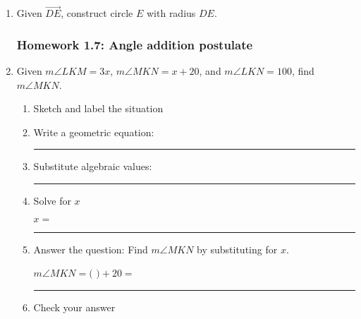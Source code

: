 \documentclass[12pt, twoside]{article}
\begin{document}
\begin{enumerate}
\item Given $\overrightarrow{DE}$, construct circle $E$ with radius $DE$.
    \vspace{3cm}
    \begin{center}
    \end{center}

\newpage
\subsubsection*{Homework 1.7: Angle addition postulate}
\item Given $m\angle LKM = 3x$, $m\angle MKN = x+20$, and $m\angle LKN = 100$, find $m\angle MKN$.  \vspace{1cm}
  \begin{enumerate}
    \item Sketch and label the situation
    \begin{flushright}
    \end{flushright}
    \vspace{1cm}

  \item Write a geometric equation: \rule{5cm}{0.15mm} \vspace{1cm}
  \item Substitute algebraic values: \rule{5cm}{0.15mm}
  \item Solve for $x$
    \vspace{3cm}
    \begin{center} $x=$ \rule{1cm}{0.15mm} \end{center}
    \item Answer the question: Find $m\angle MKN$ by substituting for $x$.\\
    \begin{center} $m\angle MKN=($ \hspace{1cm} $)+20=$ \rule{1cm}{0.15mm} \end{center}
    \item Check your answer
  \end{enumerate}
  \vspace{2cm}


\end{enumerate}
\end{document}
